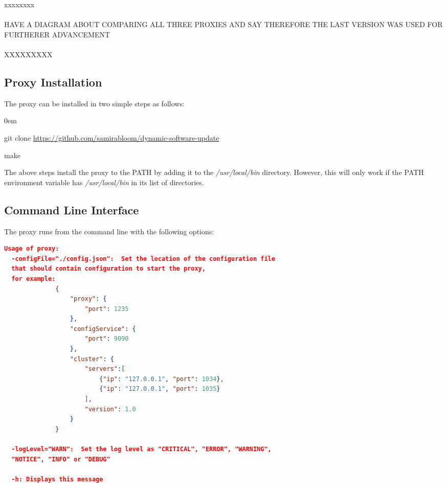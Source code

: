 \documentclass[a4paper,11pt,twoside]{article}
\begin{document}
xxxxxxxx\\\\
HAVE A DIAGRAM ABOUT COMPARING ALL THREE PROXIES AND SAY THEREFORE THE LAST VERSION WAS USED FOR FURTHERER ADVANCEMENT\\\\

XXXXXXXXX\\



\subsection{Proxy Installation}
The proxy can be installed in two simple steps as follows:
\begin{list}{-}{}
  \itemsep0em
  \item git clone \url {https://github.com/samirabloom/dynamic-software-update} 
  \item make
\end{list}

\noindent
The above steps install the proxy to the PATH by adding it to the \textit{/usr/local/bin} directory. However, this will only work if the PATH environment variable has \textit{/usr/local/bin} in its list of directories. 

\subsection{Command Line Interface}
The proxy runs from the command line with the following options:\\

\begin{lstlisting}[language=json,firstnumber=1]
Usage of proxy:
  -configFile="./config.json":  Set the location of the configuration file 
  that should contain configuration to start the proxy, 
  for example:
              {
                  "proxy": {
                      "port": 1235
                  },
                  "configService": {
                      "port": 9090
                  },
                  "cluster": {
                      "servers":[
                          {"ip": "127.0.0.1", "port": 1034},
                          {"ip": "127.0.0.1", "port": 1035}
                      ],
                      "version": 1.0
                  }
              }

  -logLevel="WARN":  Set the log level as "CRITICAL", "ERROR", "WARNING", 
  "NOTICE", "INFO" or "DEBUG"

  -h: Displays this message
\end{lstlisting} 
\end{document}
